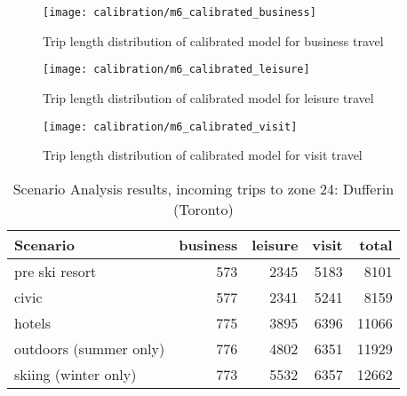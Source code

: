 \begin{figure}[H]
\centering
\texttt{[image: calibration/m6\_calibrated\_business]}
\caption{Trip length distribution of calibrated model for business travel}
\label{fig:calibration-business}
\end{figure}


\begin{figure}[H]
\centering
\texttt{[image: calibration/m6\_calibrated\_leisure]}
\caption{Trip length distribution of calibrated model for leisure travel}
\label{fig:calibration-leisure}
\end{figure}


\begin{figure}[H]
\centering
\texttt{[image: calibration/m6\_calibrated\_visit]}
\caption{Trip length distribution of calibrated model for visit travel}
\label{fig:calibration-visit}
\end{figure}

\begin{table}[ht]
\caption{Scenario Analysis results, incoming trips to zone 24: Dufferin (Toronto)}
\label{table:scenario-results}
\centering
\begin{tabular}{lrrrr}
Scenario & business & leisure & visit & total\\
\midrule
pre ski resort & 573   & 2345  & 5183  & 8101 \\
\midrule
civic & 577   & 2341  & 5241  & 8159 \\
hotels & 775   & 3895  & 6396  & 11066 \\
outdoors (summer only) & 776   & 4802  & 6351  & 11929 \\
skiing (winter only) & 773   & 5532  & 6357  & 12662 \\
   \bottomrule
\end{tabular}%

\end{table}



